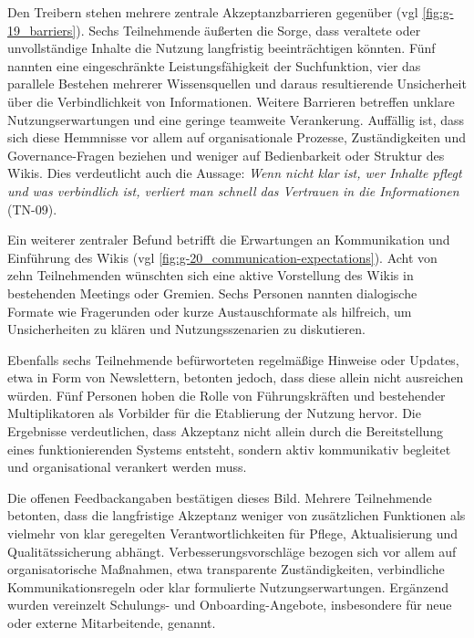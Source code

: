 
Den Treibern stehen mehrere zentrale Akzeptanzbarrieren gegenüber (\acrshort{vgl} \autoref{fig:g-19_barriers}). Sechs Teilnehmende äußerten die Sorge, dass veraltete oder unvollständige Inhalte die Nutzung langfristig beeinträchtigen könnten. Fünf nannten eine eingeschränkte Leistungsfähigkeit der Suchfunktion, vier das parallele Bestehen mehrerer Wissensquellen und daraus resultierende Unsicherheit über die Verbindlichkeit von Informationen. Weitere Barrieren betreffen unklare Nutzungserwartungen und eine geringe teamweite Verankerung.
Auffällig ist, dass sich diese Hemmnisse vor allem auf organisationale Prozesse, Zuständigkeiten und Governance-Fragen beziehen und weniger auf Bedienbarkeit oder Struktur des Wikis. Dies verdeutlicht auch die Aussage:
\textit{\glqq Wenn nicht klar ist, wer Inhalte pflegt und was verbindlich ist, verliert man schnell das Vertrauen in die Informationen\grqq{}} (TN-09).


Ein weiterer zentraler Befund betrifft die Erwartungen an Kommunikation und Einführung des Wikis (\acrshort{vgl} \autoref{fig:g-20_communication-expectations}). Acht von zehn Teilnehmenden wünschten sich eine aktive Vorstellung des Wikis in bestehenden Meetings oder Gremien. Sechs Personen nannten dialogische Formate wie Fragerunden oder kurze Austauschformate als hilfreich, um Unsicherheiten zu klären und Nutzungsszenarien zu diskutieren.

Ebenfalls sechs Teilnehmende befürworteten regelmäßige Hinweise oder Updates, etwa in Form von Newslettern, betonten jedoch, dass diese allein nicht ausreichen würden.
Fünf Personen hoben die Rolle von Führungskräften und bestehender Multiplikatoren als Vorbilder für die Etablierung der Nutzung hervor. Die Ergebnisse verdeutlichen, dass Akzeptanz nicht allein durch die Bereitstellung eines funktionierenden Systems entsteht, sondern aktiv kommunikativ begleitet und organisational verankert werden muss.

Die offenen Feedbackangaben bestätigen dieses Bild. Mehrere Teilnehmende betonten, dass die langfristige Akzeptanz weniger von zusätzlichen Funktionen als vielmehr von klar geregelten Verantwortlichkeiten für Pflege, Aktualisierung und Qualitätssicherung abhängt. Verbesserungsvorschläge bezogen sich vor allem auf organisatorische Maßnahmen, etwa transparente Zuständigkeiten, verbindliche Kommunikationsregeln oder klar formulierte Nutzungserwartungen. Ergänzend wurden vereinzelt Schulungs- und Onboarding-Angebote, insbesondere für neue oder externe Mitarbeitende, genannt.

